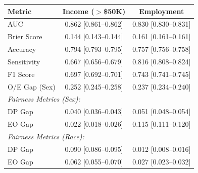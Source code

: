 \setlength{\tabcolsep}{4pt}
\renewcommand{\arraystretch}{1.08}
\begin{tabular*}{\textwidth}{@{\extracolsep{\fill}}lcc}
\toprule
Metric & Income ($>$\$50K) & Employment \\
\midrule
AUC & 0.862 [0.861--0.862] & 0.830 [0.830--0.831] \\
Brier Score & 0.144 [0.143--0.144] & 0.161 [0.161--0.161] \\
Accuracy & 0.794 [0.793--0.795] & 0.757 [0.756--0.758] \\
Sensitivity & 0.667 [0.656--0.679] & 0.816 [0.808--0.824] \\
F1 Score & 0.697 [0.692--0.701] & 0.743 [0.741--0.745] \\
O/E Gap (Sex) & 0.252 [0.245--0.258] & 0.237 [0.234--0.240] \\
\midrule
\multicolumn{3}{l}{\textit{Fairness Metrics (Sex):}} \\
DP Gap & 0.040 [0.036--0.043] & 0.051 [0.048--0.054] \\
EO Gap & 0.022 [0.018--0.026] & 0.115 [0.111--0.120] \\
\midrule
\multicolumn{3}{l}{\textit{Fairness Metrics (Race):}} \\
DP Gap & 0.090 [0.086--0.095] & 0.012 [0.008--0.016] \\
EO Gap & 0.062 [0.055--0.070] & 0.027 [0.023--0.032] \\
\bottomrule
\end{tabular*}
